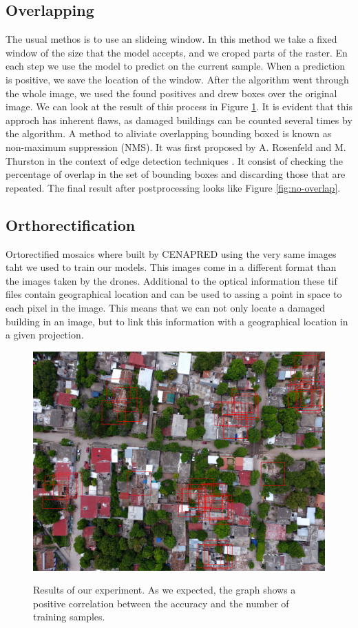 \subsection{Overlapping}

The usual methos is to use an slideing window. In this method we take a fixed window of the size that the model accepts, and we croped parts of the raster. En each step we use the model to predict on the current sample. When a prediction is positive, we save the location of the window. After the algorithm went through the whole image, we used the found positives and drew boxes over the original image. We can look at the result of this process in Figure \ref{fig:overlap}. It is evident that this approch has inherent flaws, as damaged buildings can be counted several times by the algorithm. A method to aliviate overlapping bounding boxed is known as non-maximum suppression (NMS). It was first proposed by A. Rosenfeld and M. Thurston in the context of edge detection techniques \cite{1671883}. It consist of checking the percentage of overlap in the set of bounding boxes and discarding those that are repeated. The final result after postprocessing looks like Figure \ref{fig:no-overlap}.

\subsection{Orthorectification}


Ortorectified mosaics where built by CENAPRED using the very same images taht we used to train our models. This images come in a different format than the images taken by the drones. Additional to the optical information these tif files contain geographical location and can be used to assing a point in space to each pixel in the image. This means that we can not only locate a damaged building in an image, but to link this information with a geographical location in a given projection.\\

\begin{figure}[h]
  \centering
  \includegraphics[width=\textwidth]{images/overlap.jpg}
  \label{fig:overlap}
  \caption{Results of our experiment. As we expected, the graph shows a positive correlation between the accuracy and the number of training samples.}
\end{figure}

